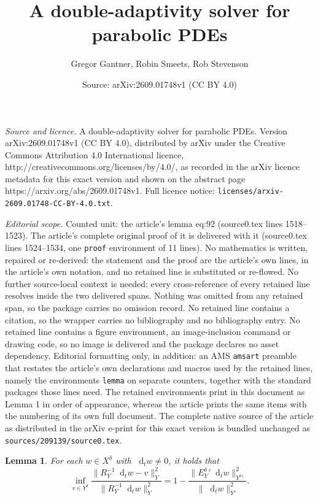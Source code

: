 \documentclass[10pt,a4paper]{amsart}
\title{A double-adaptivity solver for parabolic PDEs}
\author{Gregor Gantner, Robin Smeets, Rob Stevenson}
\date{Source: arXiv:2609.01748v1 (CC BY 4.0)}
\newtheorem{lemma}{Lemma}
\newcommand{\be}{\begin{equation}}
\newcommand*\diff{\mathop{}\!\mathrm{d}}
\newcommand{\ee}{\end{equation}}
\begin{document}
\maketitle

\noindent\emph{Source and licence.} A double-adaptivity solver for parabolic PDEs. Version arXiv:2609.01748v1 (CC BY 4.0), distributed by arXiv under the Creative Commons Attribution 4.0 International licence, http://creativecommons.org/licenses/by/4.0/, as recorded in the arXiv licence metadata for this exact version and shown on the abstract page https://arxiv.org/abs/2609.01748v1. Full licence notice: \texttt{licenses/arxiv-2609.01748-CC-BY-4.0.txt}.\par\smallskip

\noindent\textit{Editorial scope.} Counted unit: the article's lemma eq:92 (source0.tex lines 1518--1523). The article's complete original proof of it is delivered with it (source0.tex lines 1524--1534, one \texttt{proof} environment of 11 lines). No mathematics is written, repaired or re-derived: the statement and the proof are the article's own lines, in the article's own notation, and no retained line is substituted or re-flowed.  No further source-local context is needed: every cross-reference of every retained line resolves inside the two delivered spans.  Nothing was omitted from any retained span, so the package carries no omission record.  No retained line contains a citation, so the wrapper carries no bibliography and no bibliography entry.  No retained line contains a figure environment, an image-inclusion command or drawing code, so no image is delivered and the package declares no asset dependency.  Editorial formatting only, in addition: an AMS \texttt{amsart} preamble that restates the article's own declarations and macros used by the retained lines, namely the environments \texttt{lemma} on separate counters, together with the standard packages those lines need.  The retained environments print in this document as Lemma 1 in order of appearance, whereas the article prints the same items with the numbering of its own full document.  The complete native source of the article as distributed in the arXiv e-print for this exact version is bundled unchanged as \texttt{sources/209139/source0.tex}.
\begin{lemma}
For \emph{each} $w\in X^\delta$ with $\diff_t  w \neq 0$, it holds that
\be \label{eq:92}
\inf_{v \in Y^\delta} \frac{\|R_Y^{-1}\diff_t  w  -v\|^2_Y}{\|R_Y^{-1}\diff_t  w\|^2_Y}=1-\frac{\|{E_Y^\delta}'\diff_t  w\|_{{Y^\delta}'}^2}{\|\diff_t  w\|_{Y'}^2}.
\ee
\end{lemma}
\end{document}
